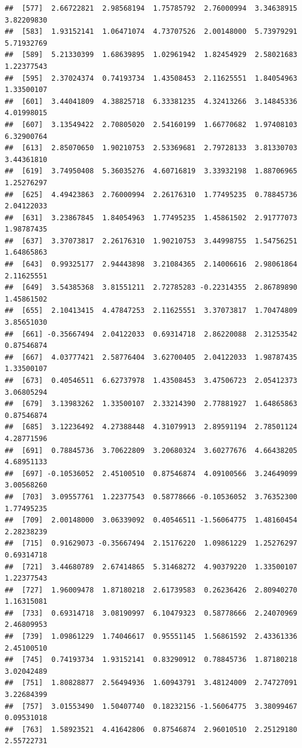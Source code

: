 \documentclass[
]{article}
\begin{document}
\begin{verbatim}
##  [577]  2.66722821  2.98568194  1.75785792  2.76000994  3.34638915  3.82209830
##  [583]  1.93152141  1.06471074  4.73707526  2.00148000  5.73979291  5.71932769
##  [589]  5.21330399  1.68639895  1.02961942  1.82454929  2.58021683  1.22377543
##  [595]  2.37024374  0.74193734  1.43508453  2.11625551  1.84054963  1.33500107
##  [601]  3.44041809  4.38825718  6.33381235  4.32413266  3.14845336  4.01998015
##  [607]  3.13549422  2.70805020  2.54160199  1.66770682  1.97408103  6.32900764
##  [613]  2.85070650  1.90210753  2.53369681  2.79728133  3.81330703  3.44361810
##  [619]  3.74950408  5.36035276  4.60716819  3.33932198  1.88706965  1.25276297
##  [625]  4.49423863  2.76000994  2.26176310  1.77495235  0.78845736  2.04122033
##  [631]  3.23867845  1.84054963  1.77495235  1.45861502  2.91777073  1.98787435
##  [637]  3.37073817  2.26176310  1.90210753  3.44998755  1.54756251  1.64865863
##  [643]  0.99325177  2.94443898  3.21084365  2.14006616  2.98061864  2.11625551
##  [649]  3.54385368  3.81551211  2.72785283 -0.22314355  2.86789890  1.45861502
##  [655]  2.10413415  4.47847253  2.11625551  3.37073817  1.70474809  3.85651030
##  [661] -0.35667494  2.04122033  0.69314718  2.86220088  2.31253542  0.87546874
##  [667]  4.03777421  2.58776404  3.62700405  2.04122033  1.98787435  1.33500107
##  [673]  0.40546511  6.62737978  1.43508453  3.47506723  2.05412373  3.06805294
##  [679]  3.13983262  1.33500107  2.33214390  2.77881927  1.64865863  0.87546874
##  [685]  3.12236492  4.27388448  4.31079913  2.89591194  2.78501124  4.28771596
##  [691]  0.78845736  3.70622809  3.20680324  3.60277676  4.66438205  4.68951133
##  [697] -0.10536052  2.45100510  0.87546874  4.09100566  3.24649099  3.00568260
##  [703]  3.09557761  1.22377543  0.58778666 -0.10536052  3.76352300  1.77495235
##  [709]  2.00148000  3.06339092  0.40546511 -1.56064775  1.48160454  2.28238239
##  [715]  0.91629073 -0.35667494  2.15176220  1.09861229  1.25276297  0.69314718
##  [721]  3.44680789  2.67414865  5.31468272  4.90379220  1.33500107  1.22377543
##  [727]  1.96009478  1.87180218  2.61739583  0.26236426  2.80940270  1.16315081
##  [733]  0.69314718  3.08190997  6.10479323  0.58778666  2.24070969  2.46809953
##  [739]  1.09861229  1.74046617  0.95551145  1.56861592  2.43361336  2.45100510
##  [745]  0.74193734  1.93152141  0.83290912  0.78845736  1.87180218  3.02042489
##  [751]  1.80828877  2.56494936  1.60943791  3.48124009  2.74727091  3.22684399
##  [757]  3.01553490  1.50407740  0.18232156 -1.56064775  3.38099467  0.09531018
##  [763]  1.58923521  4.41642806  0.87546874  2.96010510  2.25129180  2.55722731

\end{verbatim}
\end{document}
